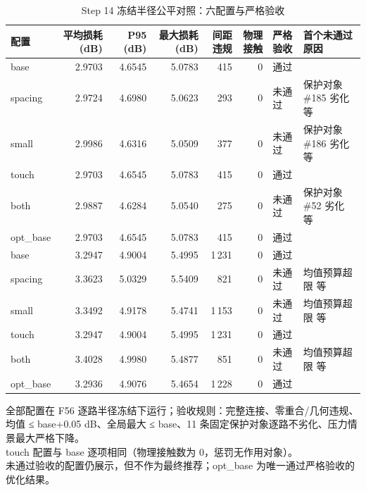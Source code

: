 \begin{table}[htbp]
  \centering
  \caption{Step 14 冻结半径公平对照：六配置与严格验收}
  \label{tab:step14-main}
  \begin{tabular}{lrrrrrll}
    \toprule
    配置 & 平均损耗 (dB) & P95 (dB) & 最大损耗 (dB) & 间距违规 & 物理接触 & 严格验收 & 首个未通过原因 \\
    \midrule
    base & 2.9703 & 4.6545 & 5.0783 & 415 & 0 & 通过 &  \\
    spacing & 2.9724 & 4.6980 & 5.0623 & 293 & 0 & 未通过 & 保护对象 \#185 劣化 等 \\
    small & 2.9986 & 4.6316 & 5.0509 & 377 & 0 & 未通过 & 保护对象 \#186 劣化 等 \\
    touch & 2.9703 & 4.6545 & 5.0783 & 415 & 0 & 通过 &  \\
    both & 2.9887 & 4.6284 & 5.0540 & 275 & 0 & 未通过 & 保护对象 \#52 劣化 等 \\
    opt\_base & 2.9703 & 4.6545 & 5.0783 & 415 & 0 & 通过 &  \\
    \midrule
    base & 3.2947 & 4.9004 & 5.4995 & 1\,231 & 0 & 通过 &  \\
    spacing & 3.3623 & 5.0329 & 5.5409 & 821 & 0 & 未通过 & 均值预算超限 等 \\
    small & 3.3492 & 4.9178 & 5.4741 & 1\,153 & 0 & 未通过 & 均值预算超限 等 \\
    touch & 3.2947 & 4.9004 & 5.4995 & 1\,231 & 0 & 通过 &  \\
    both & 3.4028 & 4.9980 & 5.4877 & 851 & 0 & 未通过 & 均值预算超限 等 \\
    opt\_base & 3.2936 & 4.9076 & 5.4654 & 1\,228 & 0 & 通过 &  \\
    \bottomrule
  \end{tabular}
  \par\vspace{2pt}
  \begin{flushleft}\footnotesize
  全部配置在 F56 逐路半径冻结下运行；验收规则：完整连接、零重合/几何违规、均值 ≤ base+0.05 dB、全局最大 ≤ base、11 条固定保护对象逐路不劣化、压力情景最大严格下降。 \\
  touch 配置与 base 逐项相同（物理接触数为 0，惩罚无作用对象）。 \\
  未通过验收的配置仍展示，但不作为最终推荐；opt\_base 为唯一通过严格验收的优化结果。 \\
  \end{flushleft}
\end{table}
